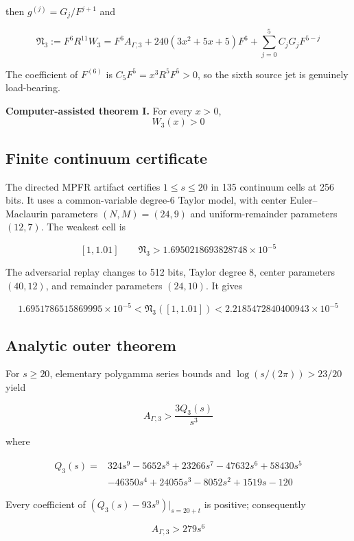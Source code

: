 \documentclass[
  11pt,
]{book}
\renewenvironment{quote}
  {\begin{tcolorbox}[
      enhanced,
      breakable,
      colback=tncream,
      colframe=tnrust,
      boxrule=0.8pt,
      arc=1.5pt,
      left=7pt,
      right=7pt,
      top=6pt,
      bottom=6pt]}
  {\end{tcolorbox}}
\begin{document}
then \(g^{(j)}=G_j/F^{j+1}\) and

\[
\boxed{
\mathfrak N_3:=F^6R^{11}W_3
=F^6A_{\Gamma,3}
+240(3x^2+5x+5)F^6
+\sum_{j=0}^{5}C_jG_jF^{5-j}
}
\tag{37.4}
\]

The coefficient of \(F^{(6)}\) is \(C_5F^5=x^3R^5F^5>0\), so the sixth
source jet is genuinely load-bearing.

\begin{quote}
\textbf{Computer-assisted theorem I.} For every \(x>0\), \[
\boxed{W_3(x)>0}
\]
\end{quote}

\subsection{Finite continuum
certificate}\label{finite-continuum-certificate-1}

The directed MPFR artifact certifies \(1\le s\le20\) in 135 continuum
cells at 256 bits. It uses a common-variable degree-6 Taylor model, with
center Euler--Maclaurin parameters \((N,M)=(24,9)\) and
uniform-remainder parameters \((12,7)\). The weakest cell is

\[
[1,1.01]
\qquad
\mathfrak N_3>1.6950218693828748\times10^{-5}
\]

The adversarial replay changes to 512 bits, Taylor degree \(8\), center
parameters \((40,12)\), and remainder parameters \((24,10)\). It gives

\[
1.6951786515869995\times10^{-5}
<\mathfrak N_3([1,1.01])
<2.2185472840400943\times10^{-5}
\]

\subsection{Analytic outer theorem}\label{analytic-outer-theorem-1}

For \(s\ge20\), elementary polygamma series bounds and
\(\log(s/(2\pi))>23/20\) yield

\[
A_{\Gamma,3}>\frac{3Q_3(s)}{s^3}
\]

where

\[
\begin{aligned}
Q_3(s)={}&324s^9-5652s^8+23266s^7-47632s^6+58430s^5\\
&-46350s^4+24055s^3-8052s^2+1519s-120
\end{aligned}
\]

Every coefficient of \((Q_3(s)-93s^9)|_{s=20+t}\) is positive;
consequently

\[
A_{\Gamma,3}>279s^6
\]
\end{document}
